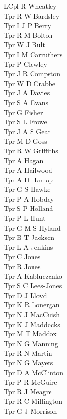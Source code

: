 \begin{multicols}{4}
  LCpl R Wheatley \\
  Tpr R W Bardsley \\
  Tpr I J P Berry \\
  Tpr R M Bolton \\
  Tpr W J Bult \\
  Tpr I M Carruthers \\
  Tpr P Clewley \\
  Tpr J R Compston \\
  Tpr W D Crabbe \\
  Tpr J A Davies \\
  Tpr S A Evans \\
  Tpr G Fisher \\
  Tpr S L Frowe \\
  Tpr J A S Gear \\
  Tpr M D Goss \\
  Tpr R W Griffiths \\
  Tpr A Hagan \\
  Tpr A Hailwood \\
  Tpr A D Harrop \\
  Tpr G S Hawke \\
  Tpr P A Hobdey \\
  Tpr S P Holland \\
  Tpr P L Hunt \\
  Tpr G M S Hyland \\
  Tpr B T Jackson \\
  Tpr L A Jenkins \\
  Tpr C Jones \\
  Tpr R Jones \\
  Tpr A Kabluczenko \\
  Tpr S C Lees-Jones \\
  Tpr D J Lloyd \\
  Tpr K R Lonergan \\
  Tpr N J MacCuish \\
  Tpr K J Maddocks \\
  Tpr M T Maddox \\
  Tpr N G Manning \\
  Tpr R N Martin \\
  Tpr N G Mayers \\
  Tpr D A McClinton \\
  Tpr P R McGuire \\
  Tpr R J Meagre \\
  Tpr R C Millington \\
  Tpr G J Morrison \\

\end{multicols}
